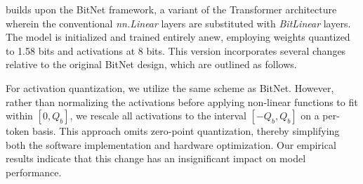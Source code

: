  builds upon the BitNet framework, a variant of the Transformer architecture wherein the conventional \emph{nn.Linear} layers are substituted with \emph{BitLinear} layers. The model is initialized and trained entirely anew, employing weights quantized to 1.58 bits and activations at 8 bits. This version incorporates several changes relative to the original BitNet design, which are outlined as follows.

For activation quantization, we utilize the same scheme as BitNet. However, rather than normalizing the activations before applying non-linear functions to fit within $[0, Q_b]$, we rescale all activations to the interval $[-Q_b, Q_b]$ on a per-token basis. This approach omits zero-point quantization, thereby simplifying both the software implementation and hardware optimization. Our empirical results indicate that this change has an insignificant impact on model performance.